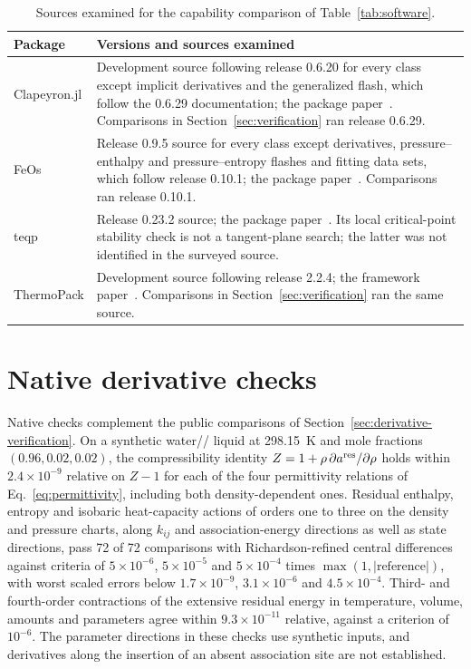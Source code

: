 \begin{table}[pos=htbp]
\centering
\caption{Sources examined for the capability comparison of Table~\ref{tab:software}.}
\label{tab:si-sources}
\small
\begin{tabularx}{\linewidth}{@{}l>{\raggedright\arraybackslash}X@{}}
\toprule
Package & Versions and sources examined \\
\midrule
Clapeyron.jl & Development source following release 0.6.20 for every class except implicit derivatives and the generalized flash, which follow the 0.6.29 documentation; the package paper~\citep{walkerClapeyronjlExtensibleOpenSource2022}. Comparisons in Section~\ref{sec:verification} ran release 0.6.29. \\
FeOs & Release 0.9.5 source for every class except derivatives, pressure--enthalpy and pressure--entropy flashes and fitting data sets, which follow release 0.10.1; the package paper~\citep{rehnerFeOsOpenSourceFramework2023}. Comparisons ran release 0.10.1. \\
teqp & Release 0.23.2 source; the package paper~\citep{bellImplementingEquationState2022}. Its local critical-point stability check is not a tangent-plane search; the latter was not identified in the surveyed source. \\
ThermoPack & Development source following release 2.2.4; the framework paper~\citep{wilhelmsenThermodynamicModelingEquations2017}. Comparisons in Section~\ref{sec:verification} ran the same source. \\
\bottomrule
\end{tabularx}
\end{table}

\section{Native derivative checks}
\label{sec:si-derivatives}
Native checks complement the public comparisons of Section~\ref{sec:derivative-verification}.
On a synthetic water// liquid at 298.15~K and mole fractions $(0.96,0.02,0.02)$, the compressibility identity $Z=1+\rho\,\partial a^{\mathrm{res}}/\partial\rho$ holds within $2.4\times10^{-9}$ relative on $Z-1$ for each of the four permittivity relations of Eq.~\eqref{eq:permittivity}, including both density-dependent ones.
Residual enthalpy, entropy and isobaric heat-capacity actions of orders one to three on the density and pressure charts, along $k_{ij}$ and association-energy directions as well as state directions, pass 72 of 72 comparisons with Richardson-refined central differences against criteria of $5\times10^{-6}$, $5\times10^{-5}$ and $5\times10^{-4}$ times $\max(1,\lvert\text{reference}\rvert)$, with worst scaled errors below $1.7\times10^{-9}$, $3.1\times10^{-6}$ and $4.5\times10^{-4}$.
Third- and fourth-order contractions of the extensive residual energy in temperature, volume, amounts and parameters agree within $9.3\times10^{-11}$ relative, against a criterion of $10^{-6}$.
The parameter directions in these checks use synthetic inputs, and derivatives along the insertion of an absent association site are not established.

